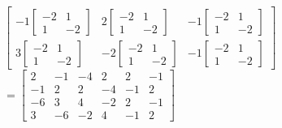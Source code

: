 \documentclass [12pt]{article}
\theoremstyle{definition}
\begin{document}
\phantom{1000em} 
$\begin{bmatrix}  
-1 \begin{bmatrix}  -2 & 1\\ 1 & -2 \end{bmatrix} & 2\begin{bmatrix}  -2 & 1\\ 1 & -2 \end{bmatrix}  & -1\begin{bmatrix}  -2 & 1\\ 1 & -2 \end{bmatrix} \\ 
3 \begin{bmatrix}  -2 & 1\\ 1 & -2 \end{bmatrix} & -2\begin{bmatrix}  -2 & 1\\ 1 & -2 \end{bmatrix} & -1\begin{bmatrix}  -2 & 1\\ 1 & -2 \end{bmatrix} 
\end{bmatrix}$\\

\phantom{1000em} 
$ = \begin{bmatrix}  
2 & -1 & -4 & 2 & 2 & -1 \\ -1 & 2 & 2 & -4 & -1 & 2 \\ -6 & 3 & 4 & -2 & 2 & -1 \\ 3 & -6 & -2 & 4 & -1 & 2
\end{bmatrix}$
\end{document}
